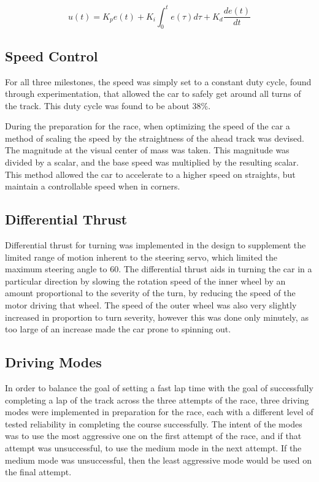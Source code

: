 \documentclass{article}
\begin{document}
\begin{equation}
    \label{eqn:pid}
    u(t) = K_p e(t) + K_i \int_{0}^{t} e(\tau) d\tau + K_d \frac{de(t)}{dt} 
\end{equation}
    

\subsection{Speed Control}
 For all three milestones, the speed was simply set to a constant duty cycle, found through experimentation, that allowed the car to safely get around all turns of the track. This duty cycle was found to be about 38\%. 
 
During the preparation for the race, when optimizing the speed of the car a method of scaling the speed by the straightness of the ahead track was devised. The magnitude at the visual center of mass was taken. This magnitude was divided by a scalar, and the base speed was multiplied by the resulting scalar. This method allowed the car to accelerate to a higher speed on straights, but maintain a controllable speed when in corners. 

\subsection{Differential Thrust}
Differential thrust for turning was implemented in the design to supplement the limited range of motion inherent to the steering servo, which limited the maximum steering angle to 60\degree. The differential thrust aids in turning the car in a particular direction by slowing the rotation speed of the inner wheel by an amount proportional to the severity of the turn, by reducing the speed of the motor driving that wheel. The speed of the outer wheel was also very slightly increased in proportion to turn severity, however this was done only minutely, as too large of an increase made the car prone to spinning out. 

\subsection{Driving Modes}
In order to balance the goal of setting a fast lap time with the goal of successfully completing a lap of the track across the three attempts of the race, three driving modes were implemented in preparation for the race, each with a different level of tested reliability in completing the course successfully. The intent of the modes was to use the most aggressive one on the first attempt of the race, and if that attempt was unsuccessful, to use the medium mode in the next attempt. If the medium mode was unsuccessful, then the least aggressive mode would be used on the final attempt. 
\end{document}
